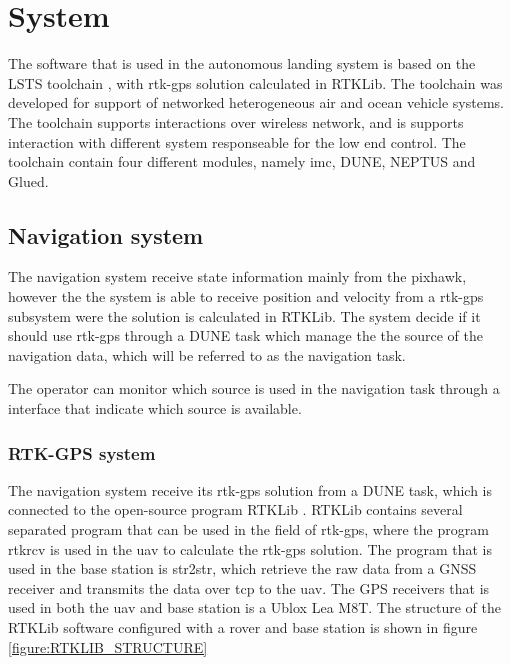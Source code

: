 \chapter{System}
The software that is used in the autonomous landing system is based on the LSTS toolchain \citep{pinto2013lsts}, with \gls{rtk-gps} solution calculated in RTKLib. The toolchain was developed for support of networked heterogeneous air and ocean vehicle systems. The toolchain supports interactions over wireless network, and is supports interaction with different system responseable for the low end control. The toolchain contain four different modules, namely \gls{imc}, DUNE, NEPTUS and Glued.
\section{Navigation system}
The navigation system receive state information mainly from the pixhawk, however the the system is able to receive position and velocity from a \gls{rtk-gps} subsystem were the solution is calculated in RTKLib. The system decide if it should use \gls{rtk-gps} through a DUNE task which manage the the source of the navigation data, which will be referred to as the navigation task.

The operator can monitor which source is used in the navigation task through a interface that indicate which source is available.

\subsection{RTK-GPS system}
The navigation system receive its \gls{rtk-gps} solution from a DUNE task, which is connected to the open-source program RTKLib \citep{takasu2009development}. RTKLib contains several separated program that can be used in the field of \gls{rtk-gps}, where the program rtkrcv is used in the \gls{uav} to calculate the \gls{rtk-gps} solution. The program that is used in the base station is str2str, which retrieve the raw data from a GNSS receiver and transmits the data over tcp to the \gls{uav}. The GPS receivers that is used in both the \gls{uav} and base station is a Ublox Lea M8T. The structure of the RTKLib software configured with a rover and base station is shown in figure \ref{figure:RTKLIB_STRUCTURE}

